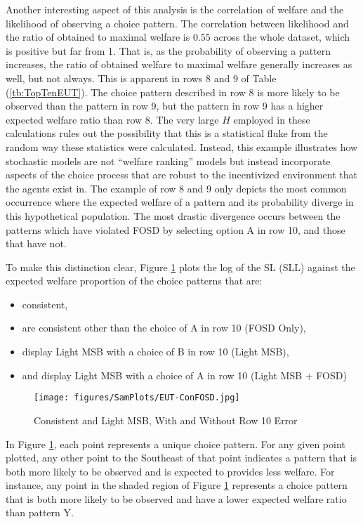 \documentclass[../main.tex]{subfiles}
\begin{document}
Another interesting aspect of this analysis is the correlation of welfare and the likelihood of observing a choice pattern.
The correlation between likelihood and the ratio of obtained to maximal welfare is $0.55$ across the whole dataset, which is positive but far from 1.
That is, as the probability of observing a pattern increases, the ratio of obtained welfare to maximal welfare generally increases as well, but not always.
This is apparent in rows 8 and 9 of Table (\ref{tb:TopTenEUT}).
The choice pattern described in row 8 is more likely to be observed than the pattern in row 9, but the pattern in row 9 has a higher expected welfare ratio than row 8.
The very large $H$ employed in these calculations rules out the possibility that this is a statistical fluke from the random way these statistics were calculated.
Instead, this example illustrates how stochastic models are not \enquote{welfare ranking} models but instead incorporate aspects of the choice process that are robust to the incentivized environment that the agents exist in.
The example of row 8 and 9 only depicts the most common occurrence where the expected welfare of a pattern and its probability diverge in this hypothetical population.
The most drastic divergence occurs between the patterns which have violated FOSD by selecting option A in row 10, and those that have not.

To make this distinction clear, Figure \ref{fig:ConFOSD} plots the log of the SL (SLL) against the expected welfare proportion of the choice patterns that are:
\begin{itemize}
 \setlength\itemsep{-.5em}
	\item consistent,
	\item are consistent other than the choice of A in row 10 (FOSD Only),
	\item display Light MSB with a choice of B in row 10 (Light MSB),
	\item and display Light MSB with a choice of A in row 10 (Light MSB + FOSD)
\end{itemize}

\begin{figure}[h!]
	\caption{Consistent and Light MSB, With and Without Row 10 Error}
	\texttt{[image: figures/SamPlots/EUT-ConFOSD.jpg]}
	\label{fig:ConFOSD}
\end{figure}

In Figure \ref{fig:ConFOSD}, each point represents a unique choice pattern.
For any given point plotted, any other point to the Southeast of that point indicates a pattern that is both more likely to be observed and is expected to provides less welfare.
For instance, any point in the shaded region of Figure \ref{fig:ConFOSD} represents a choice pattern that is both more likely to be observed and have a lower expected welfare ratio than pattern Y.
\end{document}
